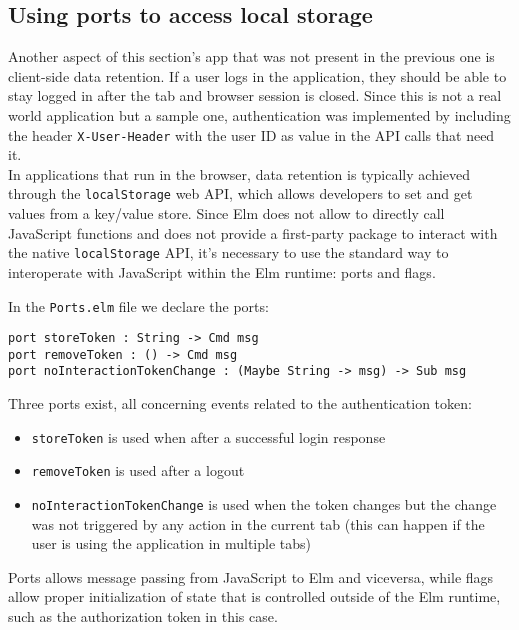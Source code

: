
\subsection{Using ports to access local storage}

Another aspect of this section's app that was not present in the previous one is client-side data retention. If a user logs in the application, they should be able to stay logged in after the tab and browser session is closed. Since this is not a real world application but a sample one, authentication was implemented by including the header \texttt{X-User-Header} with the user ID as value in the API calls that need it.\\

In applications that run in the browser, data retention is typically achieved through the \texttt{localStorage} web API\cite{noauthor_window_nodate}, which allows developers to set and get values from a key/value store. Since Elm does not allow to directly call JavaScript functions and does not provide a first-party package to interact with the native \texttt{localStorage} API, it's necessary to use the standard way to interoperate with JavaScript within the Elm runtime: ports and flags.

In the \texttt{Ports.elm} file we declare the ports:
\begin{verbatim}
port storeToken : String -> Cmd msg
port removeToken : () -> Cmd msg
port noInteractionTokenChange : (Maybe String -> msg) -> Sub msg
\end{verbatim}

Three ports exist, all concerning events related to the authentication token:
\begin{itemize}
    \item \texttt{storeToken} is used when after a successful login response
    \item \texttt{removeToken} is used after a logout
    \item \texttt{noInteractionTokenChange} is used when the token changes but the change was not triggered by any action in the current tab (this can happen if the user is using the application in multiple tabs) 
\end{itemize}
Ports allows message passing from JavaScript to Elm and viceversa, while flags allow proper initialization of state that is controlled outside of the Elm runtime, such as the authorization token in this case.\\

